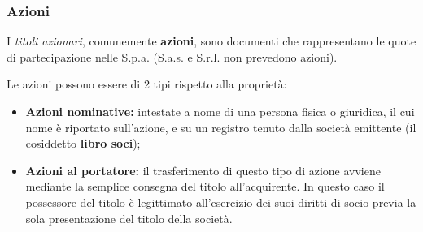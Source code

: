 \documentclass[a4paper,11pt]{article}
\begin{document}
\subsubsection{Azioni}
I \textit{titoli azionari}, comunemente \textbf{azioni}, sono documenti che rappresentano le quote di partecipazione nelle S.p.a. (S.a.s. e S.r.l. non prevedono azioni).

Le azioni possono essere di 2 tipi rispetto alla proprietà:
\begin{itemize}
	\item \textbf{Azioni nominative:} intestate a nome di una persona fisica o giuridica, il cui nome è riportato sull'azione, e su un registro tenuto dalla società emittente (il cosiddetto \textbf{libro soci});
	\item \textbf{Azioni al portatore:} il trasferimento di questo tipo di azione avviene mediante la semplice consegna del titolo all'acquirente. In questo caso il possessore del titolo è legittimato all'esercizio dei suoi diritti di socio previa la sola presentazione del titolo della società. 
\end{itemize}
\end{document}
